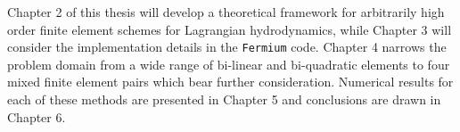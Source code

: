 Chapter 2 of this thesis will develop a theoretical framework for arbitrarily high order finite element schemes for Lagrangian hydrodynamics, while Chapter 3 will consider the implementation details in the \texttt{Fermium} code. Chapter 4 narrows the problem domain from a wide range of bi-linear and bi-quadratic elements to four mixed finite element pairs which bear further consideration. Numerical results for each of these methods are presented in Chapter 5 and conclusions are drawn in Chapter 6.